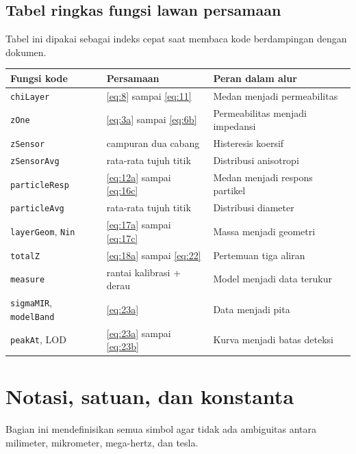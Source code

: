 \documentclass[a4paper,11pt]{article}
\begin{document}
\subsection{Tabel ringkas fungsi lawan persamaan}
Tabel ini dipakai sebagai indeks cepat saat membaca kode berdampingan
dengan dokumen.
\begin{center}
\begin{tabular}{lll}
\toprule
Fungsi kode & Persamaan & Peran dalam alur\\
\midrule
\texttt{chiLayer} & \eqref{eq:8} sampai \eqref{eq:11} & Medan menjadi permeabilitas\\
\texttt{zOne} & \eqref{eq:3a} sampai \eqref{eq:6b} & Permeabilitas menjadi impedansi\\
\texttt{zSensor} & campuran dua cabang & Histeresis koersif\\
\texttt{zSensorAvg} & rata-rata tujuh titik & Distribusi anisotropi\\
\texttt{particleResp} & \eqref{eq:12a} sampai \eqref{eq:16c} & Medan menjadi respons partikel\\
\texttt{particleAvg} & rata-rata tujuh titik & Distribusi diameter\\
\texttt{layerGeom}, \texttt{Nin} & \eqref{eq:17a} sampai \eqref{eq:17c} & Massa menjadi geometri\\
\texttt{totalZ} & \eqref{eq:18a} sampai \eqref{eq:22} & Pertemuan tiga aliran\\
\texttt{measure} & rantai kalibrasi + derau & Model menjadi data terukur\\
\texttt{sigmaMIR}, \texttt{modelBand} & \eqref{eq:23a} & Data menjadi pita\\
\texttt{peakAt}, LOD & \eqref{eq:23a} sampai \eqref{eq:23b} & Kurva menjadi batas deteksi\\
\bottomrule
\end{tabular}
\end{center}

\section{Notasi, satuan, dan konstanta}
Bagian ini mendefinisikan semua simbol agar tidak ada ambiguitas
antara milimeter, mikrometer, mega-hertz, dan tesla.
\end{document}
